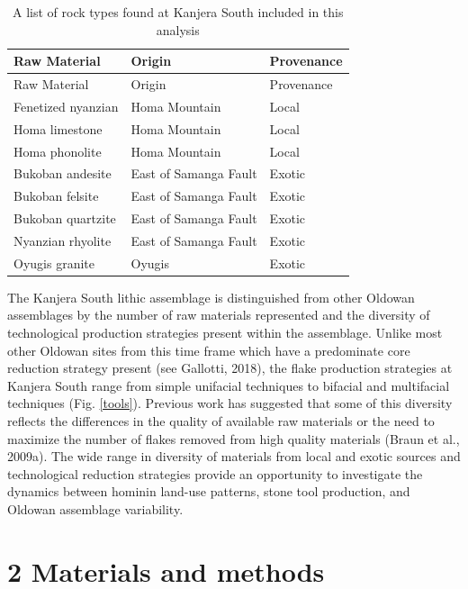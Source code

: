 \documentclass[]{elsarticle} %
\begin{document}
\begin{longtable}[]{@{}lll@{}}
\caption{A list of rock types found at Kanjera South included in this
analysis \label{table1}}\tabularnewline
\toprule
Raw Material & Origin & Provenance \\
\midrule
\endfirsthead
\toprule
Raw Material & Origin & Provenance \\
\midrule
\endhead
Fenetized nyanzian & Homa Mountain & Local \\
Homa limestone & Homa Mountain & Local \\
Homa phonolite & Homa Mountain & Local \\
Bukoban andesite & East of Samanga Fault & Exotic \\
Bukoban felsite & East of Samanga Fault & Exotic \\
Bukoban quartzite & East of Samanga Fault & Exotic \\
Nyanzian rhyolite & East of Samanga Fault & Exotic \\
Oyugis granite & Oyugis & Exotic \\
\bottomrule
\end{longtable}

The Kanjera South lithic assemblage is distinguished from other Oldowan
assemblages by the number of raw materials represented and the diversity
of technological production strategies present within the assemblage.
Unlike most other Oldowan sites from this time frame which have a
predominate core reduction strategy present (see \hspace{0pt}Gallotti,
2018\hspace{0pt}), the flake production strategies at Kanjera South
range from simple unifacial techniques to bifacial and multifacial
techniques (\hspace{0pt}Fig. \ref{tools}\hspace{0pt}). Previous work has
suggested that some of this diversity reflects the differences in the
quality of available raw materials or the need to maximize the number of
flakes removed from high quality materials (\hspace{0pt}Braun et al.,
2009a\hspace{0pt}). The wide range in diversity of materials from local
and exotic sources and technological reduction strategies provide an
opportunity to investigate the dynamics between hominin land-use
patterns, stone tool production, and Oldowan assemblage variability.

\hypertarget{materials-and-methods}{%
\section{2 Materials and methods}\label{materials-and-methods}}
\end{document}
